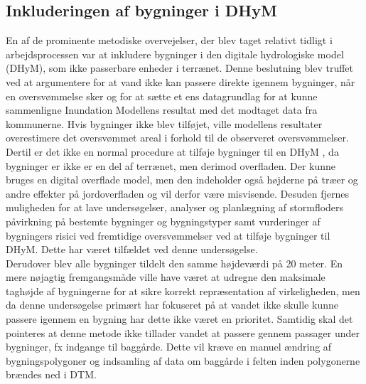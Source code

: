 \subsection{Inkluderingen af bygninger i DHyM}
En af de prominente metodiske overvejelser, der blev taget relativt tidligt i arbejdsprocessen var at inkludere bygninger i den digitale hydrologiske model (DHyM), som ikke passerbare enheder i terrænet. Denne beslutning blev truffet ved at argumentere for at vand ikke kan passere direkte igennem bygninger, når en oversvømmelse sker og for at sætte et ens datagrundlag for at kunne sammenligne Inundation Modellens resultat med det modtaget data fra kommunerne. Hvis bygninger ikke blev tilføjet, ville modellens resultater overestimere det oversvømmet areal i forhold til de observeret oversvømmelser. 
Dertil er det ikke en normal procedure at tilføje bygninger til en DHyM \citep{khosh_bin_ghomash_technical_2024}, da bygninger er ikke er en del af terrænet, men derimod overfladen. Der kunne bruges en digital overflade model, men den indeholder også højderne på træer og andre effekter på jordoverfladen og vil derfor være misvisende. Desuden fjernes muligheden for at lave undersøgelser, analyser og planlægning af stormfloders påvirkning på bestemte bygninger og bygningstyper samt vurderinger af bygningers risici ved fremtidige oversvømmelser ved at tilføje bygninger til DHyM. Dette har været tilfældet ved denne undersøgelse.\\
Derudover blev alle bygninger tildelt den samme højdeværdi på 20 meter. En mere nøjagtig fremgangsmåde ville have været at udregne den maksimale taghøjde af bygningerne for at sikre korrekt repræsentation af virkeligheden, men da denne undersøgelse primært har fokuseret på at vandet ikke skulle kunne passere igennem en bygning har dette ikke været en prioritet. Samtidig skal det pointeres at denne metode ikke tillader vandet at passere gennem passager under bygninger, fx indgange til baggårde. Dette vil kræve en manuel ændring af bygningspolygoner og indsamling af data om baggårde i felten inden polygonerne brændes ned i DTM.

